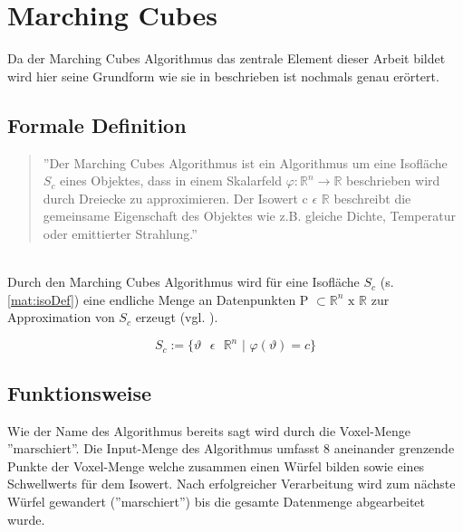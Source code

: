 \section{Marching Cubes}
Da der Marching Cubes Algorithmus das zentrale Element dieser Arbeit bildet wird hier seine Grundform wie sie in \citep{MCAlgo} beschrieben ist nochmals genau erörtert. 
\subsection{Formale Definition}
\begin{quote}
	''Der Marching Cubes Algorithmus ist ein Algorithmus um eine Isofläche $S_{c}$ eines Objektes, dass in einem Skalarfeld  $\varphi : \mathbb{R}^{n} \rightarrow \mathbb{R }$ beschrieben wird durch Dreiecke zu approximieren. Der Isowert c $\epsilon$ $ \mathbb{ R} $ beschreibt die gemeinsame Eigenschaft des Objektes wie z.B. gleiche Dichte, Temperatur oder emittierter Strahlung.''
\end{quote} \citep{WollmannBak}\\

\noindent Durch den Marching Cubes Algorithmus wird für eine Isofläche $S_{c}$ (s. \ref{mat:isoDef})
eine endliche Menge an Datenpunkten P $\subset \mathbb{R}^{n} \text{ x } \mathbb{R}$ zur Approximation von $S_{c}$ erzeugt (vgl. \citep{VisualHandbook}).

\begin{equation}
\label{mat:isoDef}
S_{c} := \{ \vartheta \text{ } \epsilon \text{ } \mathbb{R}^{n} \text{ | } \varphi(\vartheta) = c\}
\end{equation} 
\subsection{Funktionsweise}

Wie der Name des Algorithmus bereits sagt wird durch die Voxel-Menge ''marschiert''. Die Input-Menge des Algorithmus umfasst 8 aneinander grenzende Punkte der Voxel-Menge welche zusammen einen Würfel bilden sowie eines Schwellwerts für dem Isowert. Nach erfolgreicher Verarbeitung wird zum nächste Würfel gewandert (''marschiert'') bis die gesamte Datenmenge abgearbeitet wurde. 
